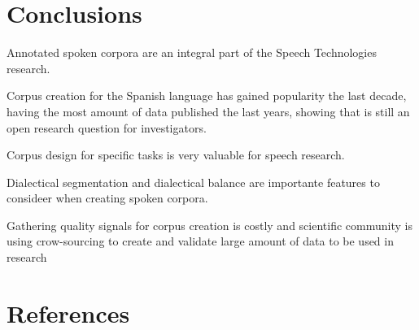 \documentclass[10pt, a4paper]{article}
\begin{document}
\section{Conclusions}

Annotated spoken corpora are an integral part of the Speech Technologies research.

Corpus creation for the Spanish language has gained popularity the last decade, having the most amount of data published the last years, showing that is still an open research question for investigators.

Corpus design for specific tasks is very valuable for speech research.

Dialectical segmentation and dialectical balance are importante features to consideer when creating spoken corpora.

Gathering quality signals for corpus creation is costly and scientific community is using crow-sourcing to create and validate large amount of data to be used in research

\section{References}



\end{document}
